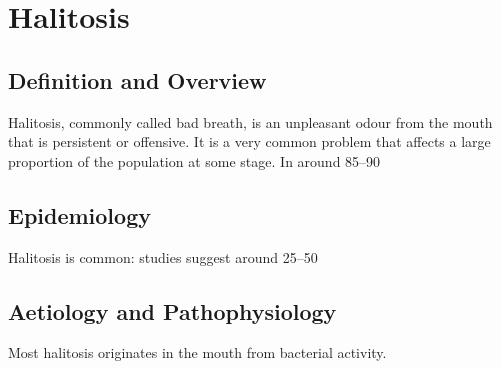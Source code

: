 \chapter{Halitosis}

\section*{Definition and Overview}
Halitosis, commonly called bad breath, is an unpleasant odour from the mouth that is persistent or offensive. It is a very common problem that affects a large proportion of the population at some stage. In around 85--90%

\section*{Epidemiology}
Halitosis is common: studies suggest around 25--50%

\section*{Aetiology and Pathophysiology}
Most halitosis originates in the mouth from bacterial activity.

